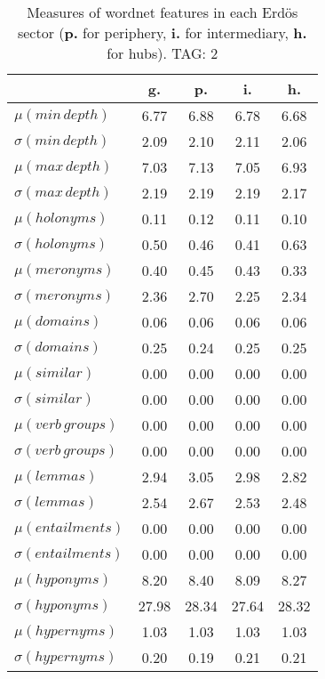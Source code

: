 \begin{table}[h!]
\begin{center}
\begin{tabular}{| l || c | c | c | c |}\hline
 & {\bf g.} & {\bf p.} & {\bf i.} & {\bf h.} \\\hline\hline
$\mu(min\,depth)$ & 6.77  & 6.88  & 6.78  & 6.68 \\
$\sigma(min\,depth)$ & 2.09  & 2.10  & 2.11  & 2.06 \\\hline
$\mu(max\,depth)$ & 7.03  & 7.13  & 7.05  & 6.93 \\
$\sigma(max\,depth)$ & 2.19  & 2.19  & 2.19  & 2.17 \\\hline
$\mu(holonyms)$ & 0.11  & 0.12  & 0.11  & 0.10 \\
$\sigma(holonyms)$ & 0.50  & 0.46  & 0.41  & 0.63 \\\hline
$\mu(meronyms)$ & 0.40  & 0.45  & 0.43  & 0.33 \\
$\sigma(meronyms)$ & 2.36  & 2.70  & 2.25  & 2.34 \\\hline
$\mu(domains)$ & 0.06  & 0.06  & 0.06  & 0.06 \\
$\sigma(domains)$ & 0.25  & 0.24  & 0.25  & 0.25 \\\hline
$\mu(similar)$ & 0.00  & 0.00  & 0.00  & 0.00 \\
$\sigma(similar)$ & 0.00  & 0.00  & 0.00  & 0.00 \\\hline
$\mu(verb\,groups)$ & 0.00  & 0.00  & 0.00  & 0.00 \\
$\sigma(verb\,groups)$ & 0.00  & 0.00  & 0.00  & 0.00 \\\hline
$\mu(lemmas)$ & 2.94  & 3.05  & 2.98  & 2.82 \\
$\sigma(lemmas)$ & 2.54  & 2.67  & 2.53  & 2.48 \\\hline
$\mu(entailments)$ & 0.00  & 0.00  & 0.00  & 0.00 \\
$\sigma(entailments)$ & 0.00  & 0.00  & 0.00  & 0.00 \\\hline
$\mu(hyponyms)$ & 8.20  & 8.40  & 8.09  & 8.27 \\
$\sigma(hyponyms)$ & 27.98  & 28.34  & 27.64  & 28.32 \\\hline
$\mu(hypernyms)$ & 1.03  & 1.03  & 1.03  & 1.03 \\
$\sigma(hypernyms)$ & 0.20  & 0.19  & 0.21  & 0.21 \\\hline
\end{tabular}
\caption{Measures of wordnet features in each Erd\"os sector ({{\bf p.}} for periphery, {{\bf i.}} for intermediary, {{\bf h.}} for hubs). TAG: 2}
\end{center}
\end{table}